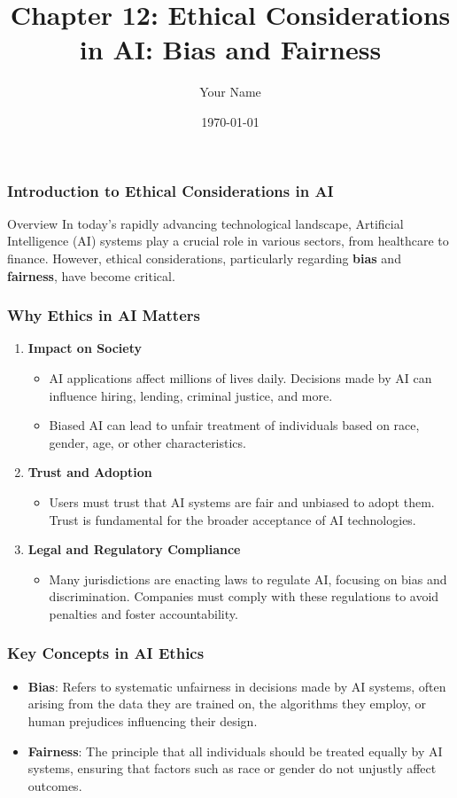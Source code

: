 \documentclass{beamer}
\title{Chapter 12: Ethical Considerations in AI: Bias and Fairness}
\author{Your Name}
\institute{Your Institution}
\date{\today}
\begin{document}
\frame{\titlepage}

\begin{frame}[fragile]
    \frametitle{Introduction to Ethical Considerations in AI}
    \begin{block}{Overview}
        In today's rapidly advancing technological landscape, Artificial Intelligence (AI) systems play a crucial role in various sectors, from healthcare to finance. However, ethical considerations, particularly regarding \textbf{bias} and \textbf{fairness}, have become critical.
    \end{block}
\end{frame}

\begin{frame}[fragile]
    \frametitle{Why Ethics in AI Matters}
    \begin{enumerate}
        \item \textbf{Impact on Society}
            \begin{itemize}
                \item AI applications affect millions of lives daily. Decisions made by AI can influence hiring, lending, criminal justice, and more.
                \item Biased AI can lead to unfair treatment of individuals based on race, gender, age, or other characteristics.
            \end{itemize}
        \item \textbf{Trust and Adoption}
            \begin{itemize}
                \item Users must trust that AI systems are fair and unbiased to adopt them. Trust is fundamental for the broader acceptance of AI technologies.
            \end{itemize}
        \item \textbf{Legal and Regulatory Compliance}
            \begin{itemize}
                \item Many jurisdictions are enacting laws to regulate AI, focusing on bias and discrimination. Companies must comply with these regulations to avoid penalties and foster accountability.
            \end{itemize}
    \end{enumerate}
\end{frame}

\begin{frame}[fragile]
    \frametitle{Key Concepts in AI Ethics}
    \begin{itemize}
        \item \textbf{Bias}: Refers to systematic unfairness in decisions made by AI systems, often arising from the data they are trained on, the algorithms they employ, or human prejudices influencing their design.
        \item \textbf{Fairness}: The principle that all individuals should be treated equally by AI systems, ensuring that factors such as race or gender do not unjustly affect outcomes.
    \end{itemize}
\end{frame}
\end{document}

